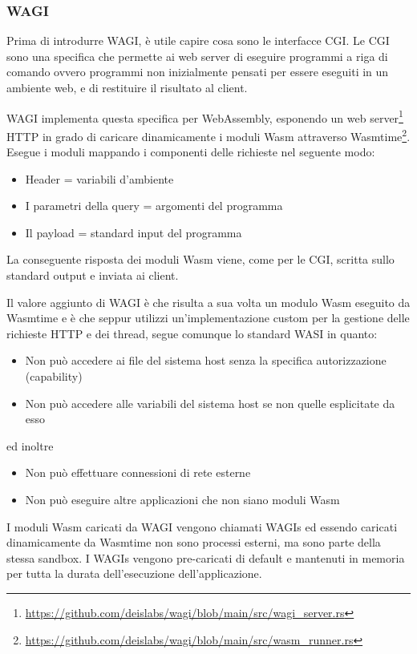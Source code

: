 \subsubsection{WAGI}
Prima di introdurre WAGI, è utile capire cosa sono le interfacce CGI. Le CGI sono una specifica che permette ai web
server di eseguire programmi a riga di comando ovvero programmi non inizialmente pensati per essere eseguiti in un
ambiente web, e di restituire il risultato al client.

WAGI implementa questa specifica per WebAssembly, esponendo un web
server\footnote{\url{https://github.com/deislabs/wagi/blob/main/src/wagi_server.rs}} HTTP in grado di caricare
dinamicamente i moduli Wasm attraverso
Wasmtime\footnote{\url{https://github.com/deislabs/wagi/blob/main/src/wasm_runner.rs}}. Esegue i moduli mappando i
componenti delle richieste nel seguente modo:
\begin{itemize}
    \item Header = variabili d'ambiente
    \item I parametri della query = argomenti del programma
    \item Il payload = standard input del programma
\end{itemize}

La conseguente risposta dei moduli Wasm viene, come per le CGI, scritta sullo standard output e inviata ai client.

Il valore aggiunto di WAGI è che risulta a sua volta un modulo Wasm eseguito da Wasmtime e è che seppur utilizzi
un'implementazione custom per la gestione delle richieste HTTP e dei thread, segue comunque lo standard WASI in quanto:
\begin{itemize}
    \item Non può accedere ai file del sistema host senza la specifica autorizzazione (capability)
    \item Non può accedere alle variabili del sistema host se non quelle esplicitate da esso
\end{itemize}
ed inoltre
\begin{itemize}
    \item Non può effettuare connessioni di rete esterne
    \item Non può eseguire altre applicazioni che non siano moduli Wasm
\end{itemize}

I moduli Wasm caricati da WAGI vengono chiamati WAGIs ed essendo caricati dinamicamente da Wasmtime non sono processi
esterni, ma sono parte della stessa sandbox. I WAGIs vengono pre-caricati di default e mantenuti in memoria per tutta la
durata dell'esecuzione dell'applicazione.

